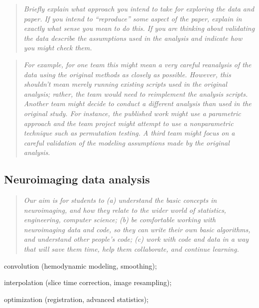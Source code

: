 \begin{quote}\emph{
Briefly explain what approach you intend to take for exploring
the data and paper.  If you intend to ``reproduce'' some aspect of the paper,
explain in exactly what sense you mean to do this.  If you are thinking about
validating the data describe the assumptions used in the analysis and indicate
how you might check them.
}\end{quote}

\begin{quote}\emph{
For example, for one team this might mean a very careful reanalysis of the data
using the original methods as closely as possible.  However, this shouldn't
mean merely running existing scripts used in the original analysis; rather, the
team would need to reimplement the analysis scripts.  Another team might decide
to conduct a different analysis than used in the original study.  For instance,
the published work might use a parametric approach and the team project might
attempt to use a nonparametric technique such as permutation testing.  A third
team might focus on a careful validation of the modeling assumptions made by
the original analysis.
}\end{quote}





\subsection{Neuroimaging data analysis}\label{analysis}

\begin{quote}\emph{
Our aim is for students to
(a) understand the basic concepts in neuroimaging,
and how they relate to the wider world of statistics, engineering, computer science;
(b) be comfortable working with neuroimaging data and code,
so they can write their own basic algorithms, and understand other people's code;
(c) work with code and data in a way that will save them time, help them collaborate,
and continue learning.%
}\end{quote}


convolution (hemodynamic modeling, smoothing);

interpolation (slice time correction, image resampling);

optimization (registration, advanced statistics);

